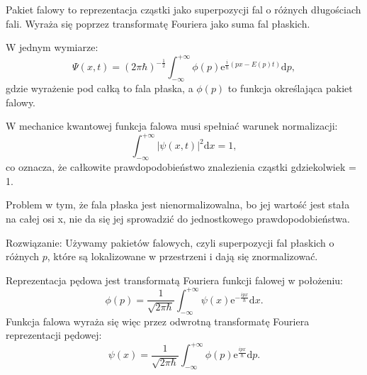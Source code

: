 Pakiet falowy to reprezentacja cząstki jako superpozycji fal o różnych długościach fali. Wyraża się poprzez transformatę Fouriera jako suma fal płaskich.

W jednym wymiarze:
$$\Psi(x,t) = (2 \pi \hbar)^{-\frac12} \int_{-\infty}^{+\infty} \phi(p) \mathrm{e}^{\frac{i}{\hbar}\left(p x - E(p)t \right)} \mathrm{d}p,$$
gdzie wyrażenie pod całką to fala płaska, a $\phi(p)$ to funkcja określająca pakiet falowy.

W mechanice kwantowej funkcja falowa musi spełniać warunek normalizacji:
$$\int_{-\infty}^{+\infty} |\psi(x,t)|^2 \mathrm{d}x = 1,$$
co oznacza, że całkowite prawdopodobieństwo znalezienia cząstki gdziekolwiek = 1. 

Problem w tym, że fala płaska jest nienormalizowalna, bo jej wartość jest stała na całej osi x, nie da się jej sprowadzić do jednostkowego prawdopodobieństwa.

Rozwiązanie: Używamy pakietów falowych, czyli superpozycji fal płaskich o różnych $p$, które są lokalizowane w przestrzeni i dają się znormalizować.

Reprezentacja pędowa jest transformatą Fouriera funkcji falowej w położeniu:
$$\phi(p) = \frac{1}{\sqrt{2\pi \hbar}} \int_{-\infty}^{+\infty} \psi(x) \mathrm{e}^{-\frac{ipx}{\hbar}} \mathrm{d} x.$$
Funkcja falowa wyraża się więc przez odwrotną transformatę Fouriera reprezentacji pędowej:
$$\psi(x) = \frac{1}{\sqrt{2\pi \hbar}} \int_{-\infty}^{+\infty} \phi(p) \mathrm{e}^{\frac{ipx}{\hbar}} \mathrm{d} p.$$

